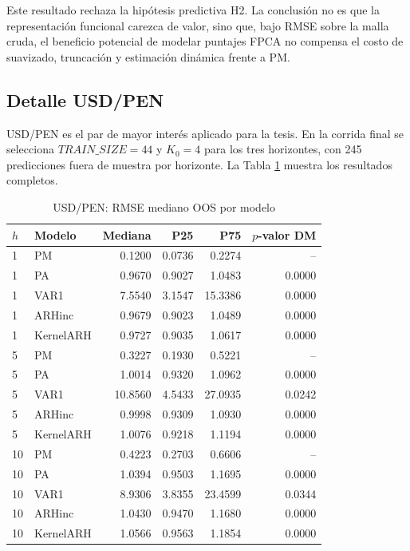 \documentclass[a4paper,11pt]{article}
\begin{document}
Este resultado rechaza la hipótesis predictiva H2. La conclusión no es que la representación funcional carezca de valor, sino que, bajo RMSE sobre la malla cruda, el beneficio potencial de modelar puntajes FPCA no compensa el costo de suavizado, truncación y estimación dinámica frente a PM.

\subsection{Detalle USD/PEN}

USD/PEN es el par de mayor interés aplicado para la tesis. En la corrida final se selecciona \(TRAIN\_SIZE=44\) y \(K_0=4\) para los tres horizontes, con 245 predicciones fuera de muestra por horizonte. La Tabla \ref{tab:usdpen_rmse} muestra los resultados completos.

\begin{table}[H]
\centering
\caption{USD/PEN: RMSE mediano OOS por modelo}
\label{tab:usdpen_rmse}
\small
\begin{tabular}{llrrrr}
\toprule
\(h\) & Modelo & Mediana & P25 & P75 & \(p\)-valor DM \\
\midrule
1 & PM & 0.1200 & 0.0736 & 0.2274 & -- \\
1 & PA & 0.9670 & 0.9027 & 1.0483 & 0.0000 \\
1 & VAR1 & 7.5540 & 3.1547 & 15.3386 & 0.0000 \\
1 & ARHinc & 0.9679 & 0.9023 & 1.0489 & 0.0000 \\
1 & KernelARH & 0.9727 & 0.9035 & 1.0617 & 0.0000 \\
5 & PM & 0.3227 & 0.1930 & 0.5221 & -- \\
5 & PA & 1.0014 & 0.9320 & 1.0962 & 0.0000 \\
5 & VAR1 & 10.8560 & 4.5433 & 27.0935 & 0.0242 \\
5 & ARHinc & 0.9998 & 0.9309 & 1.0930 & 0.0000 \\
5 & KernelARH & 1.0076 & 0.9218 & 1.1194 & 0.0000 \\
10 & PM & 0.4223 & 0.2703 & 0.6606 & -- \\
10 & PA & 1.0394 & 0.9503 & 1.1695 & 0.0000 \\
10 & VAR1 & 8.9306 & 3.8355 & 23.4599 & 0.0344 \\
10 & ARHinc & 1.0430 & 0.9470 & 1.1680 & 0.0000 \\
10 & KernelARH & 1.0566 & 0.9563 & 1.1854 & 0.0000 \\
\bottomrule
\end{tabular}
\end{table}
\end{document}

